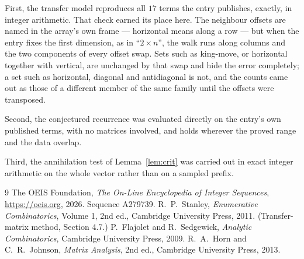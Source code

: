 \documentclass[11pt,a4paper]{article}
\theoremstyle{plain}
\theoremstyle{definition}
\begin{document}
First, the transfer model reproduces all $17$ terms the entry publishes, exactly, in
integer arithmetic. That check earned its place here. The neighbour offsets are named in the
array's own frame --- horizontal means along a row --- but when the entry fixes the first
dimension, as in ``$2\times n$'', the walk runs along columns and the two components of every
offset swap. Sets such as king-move, or horizontal together with vertical, are unchanged by
that swap and hide the error completely; a set such as horizontal, diagonal and antidiagonal
is not, and the counts came out as those of a different member of the same family until the
offsets were transposed.

Second, the conjectured recurrence was evaluated directly on the entry's own published terms,
with no matrices involved, and holds wherever the proved range and the data overlap.

Third, the annihilation test of Lemma~\ref{lem:crit} was carried out in exact integer
arithmetic on the whole vector rather than on a sampled prefix.

\begin{thebibliography}{9}
 The OEIS Foundation, \emph{The On-Line Encyclopedia of Integer
Sequences}, \url{https://oeis.org}, 2026. Sequence A279739.
 R.~P.~Stanley, \emph{Enumerative Combinatorics}, Volume 1, 2nd ed.,
Cambridge University Press, 2011. (Transfer-matrix method, Section 4.7.)
 P.~Flajolet and R.~Sedgewick, \emph{Analytic Combinatorics}, Cambridge
University Press, 2009.
 R.~A.~Horn and C.~R.~Johnson, \emph{Matrix Analysis}, 2nd ed., Cambridge
University Press, 2013.
\end{thebibliography}
\end{document}
